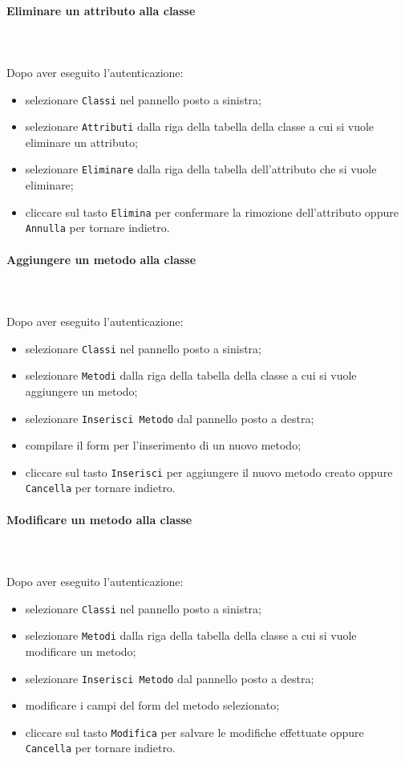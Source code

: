 \paragraph{Eliminare un attributo alla classe} \mbox{}\\ \mbox{}\\
Dopo aver eseguito l'autenticazione:
\begin{itemize}
	\item selezionare \texttt{Classi} nel pannello posto a sinistra;
	\item selezionare \texttt{Attributi} dalla riga della tabella della classe
		a cui si vuole eliminare un attributo;\
	\item selezionare \texttt{Eliminare} dalla riga della tabella dell'attributo 
		che si vuole eliminare;
	\item cliccare sul tasto \texttt{Elimina} per confermare la rimozione dell'attributo
		oppure \texttt{Annulla} per tornare indietro.
\end{itemize}

\paragraph{Aggiungere un metodo alla classe} \mbox{}\\ \mbox{}\\
Dopo aver eseguito l'autenticazione:
\begin{itemize}
	\item selezionare \texttt{Classi} nel pannello posto a sinistra;
	\item selezionare \texttt{Metodi} dalla riga della tabella della classe
		a cui si vuole aggiungere un metodo;
	\item selezionare \texttt{Inserisci Metodo} dal pannello posto a destra;
	\item compilare il form per l'inserimento di un nuovo metodo;
	\item cliccare sul tasto \texttt{Inserisci} per aggiungere il nuovo metodo 
		creato oppure \texttt{Cancella} per tornare indietro.	
\end{itemize}

\paragraph{Modificare un metodo alla classe} \mbox{}\\ \mbox{}\\
Dopo aver eseguito l'autenticazione:
\begin{itemize}
	\item selezionare \texttt{Classi} nel pannello posto a sinistra;
	\item selezionare \texttt{Metodi} dalla riga della tabella della classe
		a cui si vuole modificare un metodo;
	\item selezionare \texttt{Inserisci Metodo} dal pannello posto a destra;
	\item modificare i campi del form del metodo selezionato;
	\item cliccare sul tasto \texttt{Modifica} per salvare le modifiche effettuate
		oppure \texttt{Cancella} per tornare indietro.	
\end{itemize}

